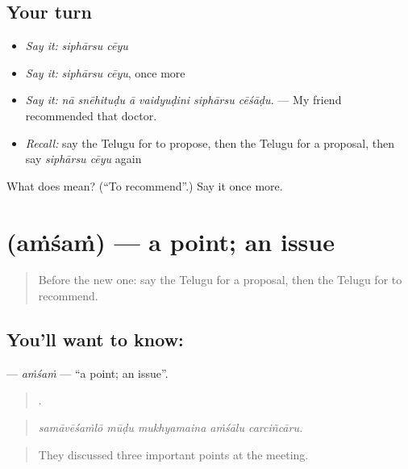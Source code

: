 \subsection*{Your turn}
\begin{itemize}
\raggedright
  \item \emph{Say it:} \emph{siphārsu cēyu}
  \item \emph{Say it:} \emph{siphārsu cēyu}, once more
  \item \emph{Say it:} \emph{nā snēhituḍu ā vaidyuḍini siphārsu cēśāḍu.} — My friend recommended that doctor.
  \item \emph{Recall:} say the Telugu for to propose, then the Telugu for a proposal, then say \emph{siphārsu cēyu} again
\end{itemize}

\begin{tcolorbox}[breakable,colback=teal!4,colframe=teal!35!black,title={Before you move on}]
What does   mean? (\textquotedblleft{}To recommend\textquotedblright{}.) Say it once more.
\end{tcolorbox}
\section[\texorpdfstring{\te{అంశం} (aṁśaṁ)}{అంశం (aṁśaṁ)}]{ (aṁśaṁ) — a point; an issue}

\label{lesson:TE-C384-amsam}



\begin{quote}
Before the new one: say the Telugu for a proposal, then the Telugu for to recommend.
\end{quote}

\subsection*{You'll want to know: }
\textbf{} — \emph{aṁśaṁ} — \textquotedblleft{}a point; an issue\textquotedblright{}.

\begin{quote}
    .
\end{quote}

\begin{quote}
\emph{samāvēśaṁlō mūḍu mukhyamaina aṁśālu carciñcāru.}
\end{quote}

\begin{quote}
They discussed three important points at the meeting.
\end{quote}

